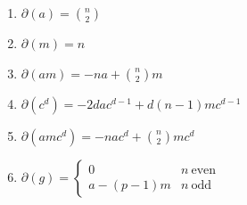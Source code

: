 \documentclass{amsart}
\begin{document}
\begin{lemma}\label{lem:PartialIdentities}

    \begin{enumerate}
        \item $\partial(a) = \binom{n}{2}$
        \item $\partial(m) = n$
        \item $\partial(am) = -na + \binom{n}{2}m$
        \item $\partial(c^d) = -2dac^{d-1} + d(n-1)mc^{d-1}$
        \item $\partial(amc^d) = -nac^d + \binom{n}{2}mc^d$
        \item $\partial(g) = \begin{cases}
            0 & n~\text{even}\\
            a - (p-1)m& n~\text{odd}
        \end{cases}$
    \end{enumerate}
\end{lemma}
\end{document}
